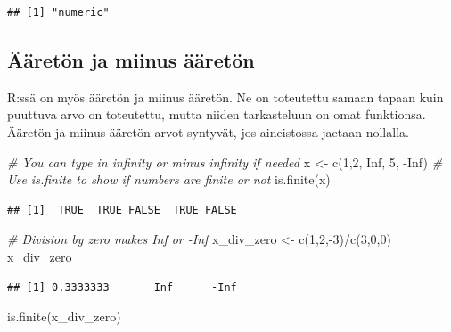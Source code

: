 \documentclass[
]{book}
\newenvironment{Shaded}{\begin{snugshade}}{\end{snugshade}}
\newcommand{\CommentTok}[1]{\textcolor[rgb]{0.56,0.35,0.01}{\textit{#1}}}
\newcommand{\ConstantTok}[1]{\textcolor[rgb]{0.00,0.00,0.00}{#1}}
\newcommand{\DecValTok}[1]{\textcolor[rgb]{0.00,0.00,0.81}{#1}}
\newcommand{\FunctionTok}[1]{\textcolor[rgb]{0.00,0.00,0.00}{#1}}
\newcommand{\NormalTok}[1]{#1}
\newcommand{\OtherTok}[1]{\textcolor[rgb]{0.56,0.35,0.01}{#1}}
\newcommand{\SpecialCharTok}[1]{\textcolor[rgb]{0.00,0.00,0.00}{#1}}
\begin{document}
\begin{verbatim}
## [1] "numeric"
\end{verbatim}

\hypertarget{uxe4uxe4retuxf6n-ja-miinus-uxe4uxe4retuxf6n}{%
\subsection{Ääretön ja miinus ääretön}\label{uxe4uxe4retuxf6n-ja-miinus-uxe4uxe4retuxf6n}}

R:ssä on myös ääretön ja miinus ääretön. Ne on toteutettu samaan tapaan kuin puuttuva arvo on toteutettu, mutta niiden tarkasteluun on omat funktionsa. Ääretön ja miinus ääretön arvot syntyvät, jos aineistossa jaetaan nollalla.

\begin{Shaded}
\begin{Highlighting}[]
\CommentTok{\# You can type in infinity or minus infinity if needed}
\NormalTok{x }\OtherTok{\textless{}{-}} \FunctionTok{c}\NormalTok{(}\DecValTok{1}\NormalTok{,}\DecValTok{2}\NormalTok{, }\ConstantTok{Inf}\NormalTok{, }\DecValTok{5}\NormalTok{, }\SpecialCharTok{{-}}\ConstantTok{Inf}\NormalTok{)}
\CommentTok{\# Use is.finite to show if numbers are finite or not}
\FunctionTok{is.finite}\NormalTok{(x)}
\end{Highlighting}
\end{Shaded}

\begin{verbatim}
## [1]  TRUE  TRUE FALSE  TRUE FALSE
\end{verbatim}

\begin{Shaded}
\begin{Highlighting}[]
\CommentTok{\# Division by zero makes Inf or {-}Inf}
\NormalTok{x\_div\_zero }\OtherTok{\textless{}{-}} \FunctionTok{c}\NormalTok{(}\DecValTok{1}\NormalTok{,}\DecValTok{2}\NormalTok{,}\SpecialCharTok{{-}}\DecValTok{3}\NormalTok{)}\SpecialCharTok{/}\FunctionTok{c}\NormalTok{(}\DecValTok{3}\NormalTok{,}\DecValTok{0}\NormalTok{,}\DecValTok{0}\NormalTok{)}
\NormalTok{x\_div\_zero}
\end{Highlighting}
\end{Shaded}

\begin{verbatim}
## [1] 0.3333333       Inf      -Inf
\end{verbatim}

\begin{Shaded}
\begin{Highlighting}[]
\FunctionTok{is.finite}\NormalTok{(x\_div\_zero)}
\end{Highlighting}
\end{Shaded}
\end{document}
